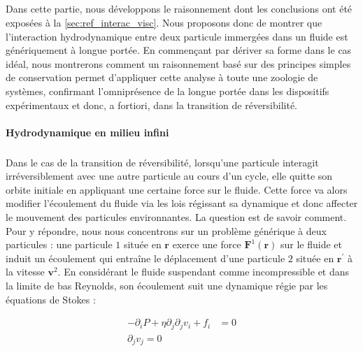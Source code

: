 \label{sec:Annexe_Interactions_Hydro}

\subparagraph{}Dans cette partie, nous développons le raisonnement dont les conclusions ont été exposées à la \autoref{sec:ref_interac_visc}. Nous proposons donc de montrer que l'interaction hydrodynamique entre deux particule immergées dans un fluide est génériquement à longue portée. En commençant par dériver sa forme dans le cas idéal, nous montrerons comment un raisonnement basé sur des principes simples de conservation permet d'appliquer cette analyse à toute une zoologie de systèmes, confirmant l'omniprésence de la longue portée dans les dispositifs expérimentaux et donc, a fortiori, dans la transition de réversibilité.

\paragraph{Hydrodynamique en milieu infini}

\subparagraph{}Dans le cas de la transition de réversibilité, lorsqu'une particule interagit irréversiblement avec une autre particule au cours d'un cycle, elle quitte son orbite initiale en appliquant une certaine force sur le fluide. Cette force va alors modifier l'écoulement du fluide via les lois régissant sa dynamique et donc affecter le mouvement des particules environnantes. La question est de savoir comment. Pour y répondre, nous nous concentrons sur un problème générique à deux particules : une particule $1$ située en $\mathbf{r}$ exerce une force $\mathbf{F}^1(\mathbf{r})$ sur le fluide et induit un écoulement qui entraîne le déplacement d'une particule $2$ située en $\mathbf{r}^\prime$ à la vitesse $\mathbf{v}^2$. En considérant le fluide suspendant comme incompressible et dans la limite de bas Reynolds, son écoulement suit une dynamique régie par les équations de Stokes :

\begin{equation}
\begin{aligned}
	-\partial_i P + \eta \partial_j\partial_j v_i + f_i &= 0 \\
	\partial_j v_j = 0
\end{aligned}
\end{equation}

